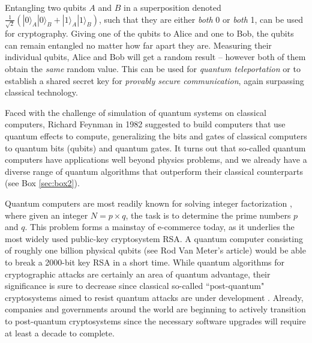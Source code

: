 \documentclass[journal]{IEEEtran}
\begin{document}
Entangling two qubits $A$ and $B$ in a superposition denoted $\frac{1}{\sqrt{2}}(|0\rangle_A|0\rangle_B + |1\rangle_A|1\rangle_B)$, such that they are either {\em both} 0 or {\em both} 1, can be used for cryptography. Giving one of the qubits to Alice and one to Bob, the qubits can remain entangled no matter how far apart they are. Measuring their individual qubits, Alice and Bob will get a random result -- however both of them obtain the {\em same} random value. This can be used for {\em quantum teleportation} or to establish a shared secret key for  {\em provably secure  communication}, again surpassing classical technology. 


Faced with the challenge of simulation of quantum systems on classical computers, Richard Feynman in 1982 \cite{Feynman1982} suggested to build computers that use quantum effects to compute, 
%
generalizing the bits and gates of classical computers to quantum bits (qubits) and quantum gates. It turns out that so-called quantum computers have applications well beyond physics problems, and we already have a diverse range of quantum algorithms that outperform their classical counterparts (see Box \ref{sec:box2}).

Quantum computers are most readily known for solving integer factorization \cite{Shor1994}, where given an integer $N=p\times q$, the task is to determine the prime numbers $p$ and $q$.  This problem forms a mainstay of e-commerce today, as it underlies the most widely used public-key cryptosystem RSA.  A quantum computer consisting of roughly one billion physical qubits {\color{red}(see Rod Van Meter's article)} would be able to break a 2000-bit key RSA in a short time.  While quantum algorithms for cryptographic attacks are certainly an area of quantum advantage, their significance is sure to decrease since classical so-called ``post-quantum" cryptosystems aimed to resist quantum attacks are under development \cite{PQcrypto15}.  Already, companies and governments around the world are beginning to actively transition to post-quantum cryptosystems since the necessary software upgrades will require at least a decade to complete.
\end{document}
